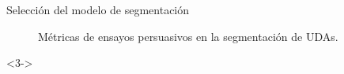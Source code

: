 \documentclass{beamer}
\begin{document}
\begin{frame}{Selección del modelo de segmentación}
\begin{onlyenv}
\begin{figure}
            \caption{Métricas de ensayos persuasivos en la segmentación de UDAs.}
        \end{figure}
    \end{onlyenv}
    \begin{onlyenv}<3->
        \begin{table}
            \begin{center}
            \caption{Métricas del segmentador en su versión completa y BIOES.}\label{table:test_metrics_segmenter}
            \end{center}
        \end{table}
    \end{onlyenv}
\end{frame}
\end{document}
